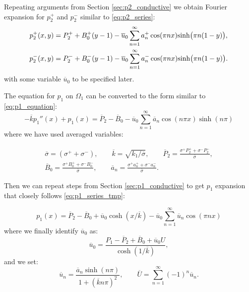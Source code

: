 \documentclass[a4paper,10pt]{article}
\def\ol#1{\overline{#1}}
\begin{document}
Repeating arguments from Section \ref{sec:p2_conductive} we obtain Fourier expansion for $p_2^+$ and $p_2^-$ similar to \eqref{eq:p2_series}:
\begin{align}
    \label{eq:p2_barrier_p}
    p_2^+(x,y) &= P_2^+ + B_0^+(y-1) - \ol{u}_0\sum_{n=1}^\infty a_n^+ \cos(\pi n x) {\rm sinh} \big(\pi n(1-y)\big),\\ 
    \label{eq:p2_barrier_m}
    p_2^-(x,y) &= P_2^- + B_0^-(y-1) - \ol{u}_0\sum_{n=1}^\infty a_n^- \cos(\pi n x) {\rm sinh} \big(\pi n(1-y)\big).
\end{align}
with some variable $\ol{u}_0$ to be specified later.

The equation for $p_1$ on $\Omega_1$ can be converted to the form similar to \eqref{eq:p1_equation}:
\begin{equation}
    \label{eq:p1_barrier_equation}
    - \ol{k}  p_1''(x) + p_1(x) = \ol{P}_2 - \ol{B}_0 - \ol{u}_0\sum_{n=1}^{\infty} \ol{a}_n \cos(n \pi x) \sinh(n \pi)
\end{equation}
where we have used averaged variables:


\begin{gather*}
    \ol{\sigma} = (\sigma^+ + \sigma^-), \qquad
    \ol{k} = \sqrt{k_1/\ol{\sigma}}, \qquad
    \ol{P}_2 = \frac{\sigma^+ P_2^+ + \sigma^- P_2^-}{\ol{\sigma}}, \\
%    
    \ol{B}_0 = \frac{\sigma^+ B_0^+ + \sigma^- B_0^-}{\ol{\sigma}}, \qquad
    \ol{a}_n = \frac{\sigma^+ a_n^+ + \sigma^- a_n^-}{\ol{\sigma}}.  
\end{gather*}

Then we can repeat steps from Section \ref{sec:p1_conductive} to get $p_1$ expansion that closely follows
\eqref{eq:p1_series_tmp}:

\begin{equation}
    \label{eq:barrier_p1_series}
    p_1(x) = \ol{P}_2 -  \ol{B}_0 + \ol{u}_0 \cosh(x/\ol{k}) - \ol{u}_0 \sum_{n=1}^\infty  \ol{u}_n \cos(\pi n x) 
\end{equation}
where we finally identify $\ol{u}_0$ as:
\begin{equation}
    \label{eq:barrier_u0_def}    
    \ol{u}_0 = \frac{P_1 - \ol{P}_2 + \ol{B}_0 + \ol{u}_0 U}{\cosh(1/\ol{k})},
\end{equation}
and we set:
\begin{equation}
    \label{eq:barriaer_un}
    \ol{u}_n = \frac{\ol{a}_n \sinh(n \pi)}{1 + (\ol{k} n \pi)^2}, \qquad
    \ol{U} =  \sum_{n=1}^{\infty} (-1)^n \ol{u}_n.
\end{equation}
\end{document}
